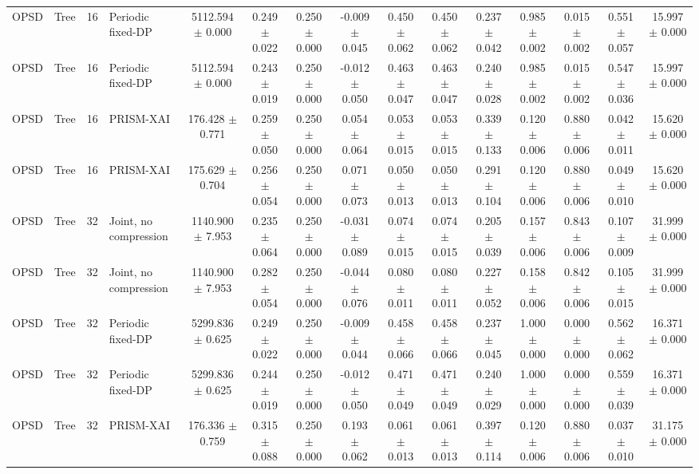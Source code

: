 \begin{tabular}{llllccccccccccc}
OPSD & Tree & 16 & Periodic fixed-DP & 5112.594 $\pm$ 0.000 & 0.249 $\pm$ 0.022 & 0.250 $\pm$ 0.000 & -0.009 $\pm$ 0.045 & 0.450 $\pm$ 0.062 & 0.450 $\pm$ 0.062 & 0.237 $\pm$ 0.042 & 0.985 $\pm$ 0.002 & 0.015 $\pm$ 0.002 & 0.551 $\pm$ 0.057 & 15.997 $\pm$ 0.000 \\
OPSD & Tree & 16 & Periodic fixed-DP & 5112.594 $\pm$ 0.000 & 0.243 $\pm$ 0.019 & 0.250 $\pm$ 0.000 & -0.012 $\pm$ 0.050 & 0.463 $\pm$ 0.047 & 0.463 $\pm$ 0.047 & 0.240 $\pm$ 0.028 & 0.985 $\pm$ 0.002 & 0.015 $\pm$ 0.002 & 0.547 $\pm$ 0.036 & 15.997 $\pm$ 0.000 \\
OPSD & Tree & 16 & PRISM-XAI & 176.428 $\pm$ 0.771 & 0.259 $\pm$ 0.050 & 0.250 $\pm$ 0.000 & 0.054 $\pm$ 0.064 & 0.053 $\pm$ 0.015 & 0.053 $\pm$ 0.015 & 0.339 $\pm$ 0.133 & 0.120 $\pm$ 0.006 & 0.880 $\pm$ 0.006 & 0.042 $\pm$ 0.011 & 15.620 $\pm$ 0.000 \\
OPSD & Tree & 16 & PRISM-XAI & 175.629 $\pm$ 0.704 & 0.256 $\pm$ 0.054 & 0.250 $\pm$ 0.000 & 0.071 $\pm$ 0.073 & 0.050 $\pm$ 0.013 & 0.050 $\pm$ 0.013 & 0.291 $\pm$ 0.104 & 0.120 $\pm$ 0.006 & 0.880 $\pm$ 0.006 & 0.049 $\pm$ 0.010 & 15.620 $\pm$ 0.000 \\
OPSD & Tree & 32 & Joint, no compression & 1140.900 $\pm$ 7.953 & 0.235 $\pm$ 0.064 & 0.250 $\pm$ 0.000 & -0.031 $\pm$ 0.089 & 0.074 $\pm$ 0.015 & 0.074 $\pm$ 0.015 & 0.205 $\pm$ 0.039 & 0.157 $\pm$ 0.006 & 0.843 $\pm$ 0.006 & 0.107 $\pm$ 0.009 & 31.999 $\pm$ 0.000 \\
OPSD & Tree & 32 & Joint, no compression & 1140.900 $\pm$ 7.953 & 0.282 $\pm$ 0.054 & 0.250 $\pm$ 0.000 & -0.044 $\pm$ 0.076 & 0.080 $\pm$ 0.011 & 0.080 $\pm$ 0.011 & 0.227 $\pm$ 0.052 & 0.158 $\pm$ 0.006 & 0.842 $\pm$ 0.006 & 0.105 $\pm$ 0.015 & 31.999 $\pm$ 0.000 \\
OPSD & Tree & 32 & Periodic fixed-DP & 5299.836 $\pm$ 0.625 & 0.249 $\pm$ 0.022 & 0.250 $\pm$ 0.000 & -0.009 $\pm$ 0.044 & 0.458 $\pm$ 0.066 & 0.458 $\pm$ 0.066 & 0.237 $\pm$ 0.045 & 1.000 $\pm$ 0.000 & 0.000 $\pm$ 0.000 & 0.562 $\pm$ 0.062 & 16.371 $\pm$ 0.000 \\
OPSD & Tree & 32 & Periodic fixed-DP & 5299.836 $\pm$ 0.625 & 0.244 $\pm$ 0.019 & 0.250 $\pm$ 0.000 & -0.012 $\pm$ 0.050 & 0.471 $\pm$ 0.049 & 0.471 $\pm$ 0.049 & 0.240 $\pm$ 0.029 & 1.000 $\pm$ 0.000 & 0.000 $\pm$ 0.000 & 0.559 $\pm$ 0.039 & 16.371 $\pm$ 0.000 \\
OPSD & Tree & 32 & PRISM-XAI & 176.336 $\pm$ 0.759 & 0.315 $\pm$ 0.088 & 0.250 $\pm$ 0.000 & 0.193 $\pm$ 0.062 & 0.061 $\pm$ 0.013 & 0.061 $\pm$ 0.013 & 0.397 $\pm$ 0.114 & 0.120 $\pm$ 0.006 & 0.880 $\pm$ 0.006 & 0.037 $\pm$ 0.010 & 31.175 $\pm$ 0.000 \\

\end{tabular}
